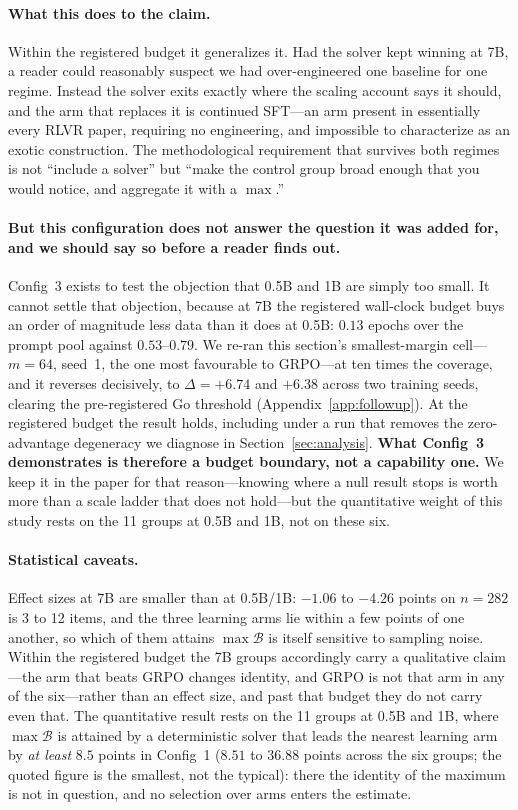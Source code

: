 \paragraph{What this does to the claim.}
Within the registered budget it generalizes it. Had the solver kept winning at
7B, a reader could reasonably suspect we had over-engineered one baseline for
one regime. Instead the solver exits exactly where the scaling account says it
should, and the arm that replaces it is continued SFT---an arm present in
essentially every RLVR paper, requiring no engineering, and impossible to
characterize as an exotic construction. The methodological requirement that
survives both regimes is not ``include a solver'' but ``make the control group
broad enough that you would notice, and aggregate it with a $\max$.''

\paragraph{But this configuration does not answer the question it was added for,
and we should say so before a reader finds out.}
Config~3 exists to test the objection that 0.5B and 1B are simply too small. It
cannot settle that objection, because at 7B the registered wall-clock budget
buys an order of magnitude less data than it does at 0.5B: $0.13$ epochs over
the prompt pool against $0.53$--$0.79$. We re-ran this section's
smallest-margin cell---$m{=}64$, seed~1, the one most favourable to GRPO---at
ten times the coverage, and it reverses decisively, to $\Delta = +6.74$ and
$+6.38$ across two training seeds, clearing the pre-registered Go threshold
(Appendix~\ref{app:followup}). At the registered budget the result holds,
including under a run that removes the zero-advantage degeneracy we diagnose in
Section~\ref{sec:analysis}. \textbf{What Config~3 demonstrates is therefore a
budget boundary, not a capability one.} We keep it in the paper for that
reason---knowing where a null result stops is worth more than a scale ladder
that does not hold---but the quantitative weight of this study rests on the 11
groups at 0.5B and 1B, not on these six.

\paragraph{Statistical caveats.}
Effect sizes at 7B are smaller than at 0.5B/1B: $-1.06$ to $-4.26$ points on
$n{=}282$ is 3 to 12 items, and the three learning arms lie within a few points
of one another, so which of them attains $\max \mathcal{B}$ is itself sensitive
to sampling noise. Within the registered budget the 7B groups accordingly carry
a qualitative claim---the arm that beats GRPO changes identity, and GRPO is not
that arm in any of the six---rather than an effect size, and past that budget
they do not carry even that. The quantitative result rests on the 11
groups at 0.5B and 1B, where $\max \mathcal{B}$ is attained by a deterministic
solver that leads the nearest learning arm by \emph{at least} $8.5$ points in
Config~1 ($8.51$ to $36.88$ points across the six groups; the quoted figure is
the smallest, not the typical): there the identity of the maximum is not in
question, and no selection over arms enters the estimate.

